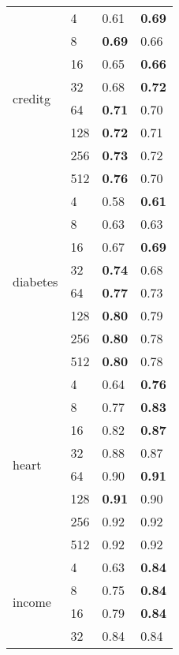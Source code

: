 \begin{table}[H]
{\begin{tabular}{llll}
\hline
\multirow{8}{*}{creditg}    
           & 4    & 0.61      & \textbf{0.69}   \\
           & 8    & \textbf{0.69}      & 0.66   \\
           & 16   & 0.65      & \textbf{0.66}   \\
           & 32   & 0.68      & \textbf{0.72}   \\
           & 64   & \textbf{0.71}      & 0.70   \\
           & 128  & \textbf{0.72}      & 0.71   \\
           & 256  & \textbf{0.73}      & 0.72   \\
           & 512  & \textbf{0.76}      & 0.70   \\
\hline
\multirow{8}{*}{diabetes}   
           & 4    & 0.58      & \textbf{0.61}   \\
           & 8    & 0.63      & 0.63   \\
           & 16   & 0.67      & \textbf{0.69}   \\
           & 32   & \textbf{0.74}      & 0.68   \\
           & 64   & \textbf{0.77}      & 0.73   \\
           & 128  & \textbf{0.80}      & 0.79   \\
           & 256  & \textbf{0.80}      & 0.78   \\
           & 512  & \textbf{0.80}      & 0.78   \\
\hline
\multirow{8}{*}{heart}      
           & 4    & 0.64      & \textbf{0.76}   \\
           & 8    & 0.77      & \textbf{0.83}   \\
           & 16   & 0.82      & \textbf{0.87}   \\
           & 32   & 0.88      & 0.87   \\
           & 64   & 0.90      & \textbf{0.91}   \\
           & 128  & \textbf{0.91}      & 0.90   \\
           & 256  & 0.92      & 0.92   \\
           & 512  & 0.92      & 0.92   \\
\hline
\multirow{8}{*}{income}     
           & 4    & 0.63      & \textbf{0.84}   \\
           & 8    & 0.75      & \textbf{0.84}   \\
           & 16   & 0.79      & \textbf{0.84}   \\
           & 32   & 0.84      & 0.84   \\

\end{tabular}}
\end{table}
